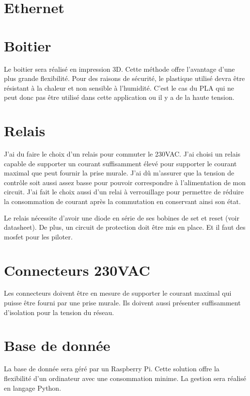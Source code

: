 \section{Ethernet}

\section{Boitier}
Le boitier sera réalisé en impression 3D. Cette méthode offre l'avantage d'une plus grande flexibilité.
Pour des raisons de sécurité, le plastique utilisé devra être résistant à la chaleur et non sensible à l'humidité. C'est le cas du PLA qui ne peut donc pas être utilisé dans cette application ou il y a de la haute tension.

\section{Relais}
J'ai du faire le choix d'un relais pour commuter le 230VAC. J'ai choisi un relais capable de supporter un courant suffisamment élevé pour supporter le courant maximal que peut fournir la prise murale. J'ai dû m'assurer que la tension de contrôle soit aussi assez basse pour pouvoir correspondre à l'alimentation de mon circuit.
J'ai fait le choix aussi d'un relai à verrouillage pour permettre de réduire la consommation de courant après la commutation en conservant ainsi son état.

Le relais nécessite d'avoir une diode en série de ses bobines de set et reset (voir datasheet).
De plus, un circuit de protection doit être mis en place. Et il faut des mosfet pour les piloter.

\section{Connecteurs 230VAC}
Les connecteurs doivent être en mesure de supporter le courant maximal qui puisse être fourni par une prise murale. Ils doivent aussi présenter suffisamment d'isolation pour la tension du réseau.


\section{Base de donnée}
La base de donnée sera géré par un Raspberry Pi. Cette solution offre la flexibilité d'un ordinateur avec une consommation minime. La gestion sera réalisé en langage Python.